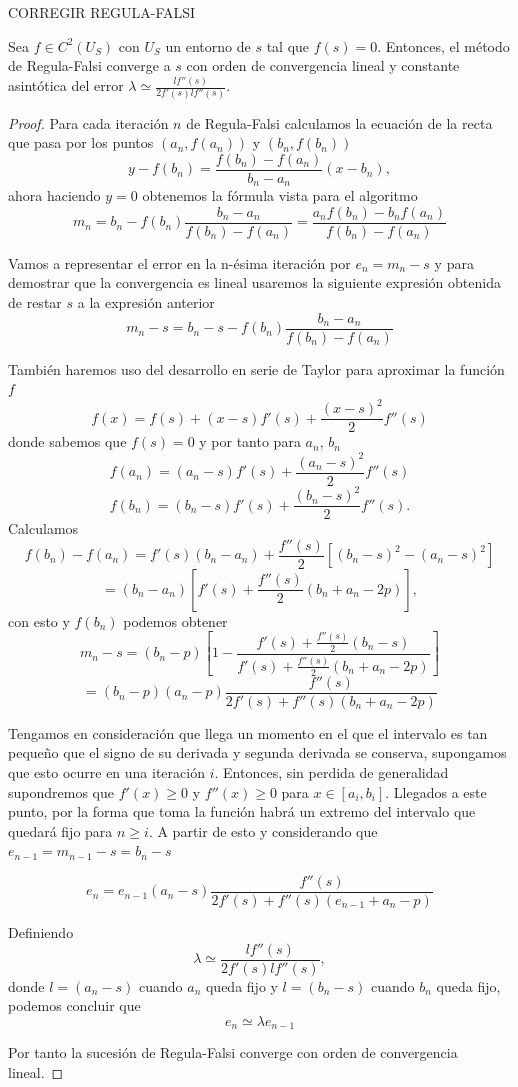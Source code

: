 CORREGIR REGULA-FALSI
\begin{teorema}
	Sea $f \in C^2(U_S)$ con $U_S$ un entorno de $s$ tal que $f(s) = 0$. Entonces, el método de Regula-Falsi converge a $s$ con orden de convergencia lineal y constante asintótica del error $\lambda \simeq \frac{l f''(s)}{2 f'(s) l f''(s)}$.
	
\end{teorema}

\begin{proof}
	Para cada iteración $n$ de Regula-Falsi calculamos la ecuación de la recta que pasa por los puntos $(a_n, f(a_n))$ y $(b_n, f(b_n))$
	\[
		y - f(b_n) = \frac{f(b_n) - f(a_n)}{b_n - a_n}(x - b_n),
	\]
	ahora haciendo $y = 0$ obtenemos la fórmula vista para el algoritmo
	\[
		m_n = b_n - f(b_n) \frac{b_n - a_n}{f(b_n) - f(a_n)} = \frac{a_n f(b_n) - b_n f(a_n)}{f(b_n) - f(a_n)}
	\]
	
	Vamos a representar el error en la n-ésima iteración por $e_n = m_n - s$ y para demostrar que la convergencia es lineal usaremos la siguiente expresión obtenida de restar $s$ a la expresión anterior
	\[
		m_n - s = b_n - s - f(b_n) \frac{b_n - a_n}{f(b_n) - f(a_n)}
	\]
	
	También haremos uso del desarrollo en serie de Taylor para aproximar la función $f$
	\[
		f(x) = f(s) + (x - s) f'(s) + \frac{(x - s)^2}{2} f''(s)
	\]
	donde sabemos que $f(s) = 0$ y por tanto para $a_n$, $b_n$
	\[
		f(a_n) = (a_n - s) f'(s) + \frac{(a_n - s)^2}{2} f''(s)
	\]
	\[
		f(b_n) = (b_n - s) f'(s) + \frac{(b_n - s)^2}{2} f''(s).
	\]
	Calculamos
	\[
		f(b_n) - f(a_n) = f'(s) (b_n - a_n) + \frac{f''(s)}{2}[(b_n - s)^2 - (a_n - s)^2]
	\]
	\[
		= (b_n - a_n) [f'(s) + \frac{f''(s)}{2} (b_n + a_n - 2p)],
	\]
	con esto y $f(b_n)$ podemos obtener
	\[
		m_n - s = (b_n - p)[1 - \frac{f'(s) + \frac{f''(s)}{2} (b_n - s)}{f'(s) + \frac{f''(s)}{2} (b_n + a_n - 2p)}]
	\]
	\[
		= (b_n - p) (a_n - p) \frac{f''(s)}{2 f'(s) + f''(s) (b_n + a_n - 2p)}
	\]
	
	Tengamos en consideración que llega un momento en el que el intervalo es tan pequeño que el signo de su derivada y segunda derivada se conserva, supongamos que esto ocurre en una iteración $i$. Entonces, sin perdida de generalidad supondremos que $f'(x) \geq 0$ y $f''(x) \geq 0$ para $x \in [a_i, b_i]$. Llegados a este punto, por la forma que toma la función habrá un extremo del intervalo que quedará fijo para $n \geq i$. A partir de esto y considerando que $e_{n-1} = m_{n-1} - s = b_n - s$
	
	\[
		e_n = e_{n-1} (a_n - s) \frac{f''(s)}{2 f'(s) + f''(s) (e_{n-1} + a_n - p)}
	\]
	
	Definiendo
	\[
		\lambda \simeq \frac{l f''(s)}{2 f'(s) l f''(s)},
	\]
	donde $l = (a_n - s)$ cuando $a_n$ queda fijo y $l = (b_n - s)$ cuando $b_n$ queda fijo, podemos concluir que
	\[
		e_n \simeq \lambda e_{n-1}
	\]
	
	Por tanto la sucesión de Regula-Falsi converge con orden de convergencia lineal.
\end{proof}
${ }$\\



